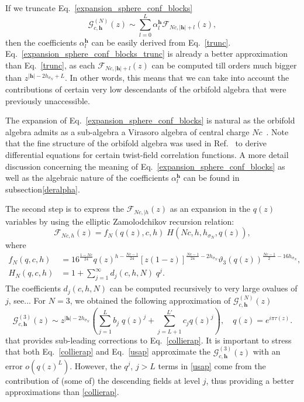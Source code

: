 \documentclass[a4paper,11pt]{article}
\begin{document}
\noindent If we truncate Eq.~\eqref{expansion_sphere_conf_blocks}  
\begin{equation}\label{expansion_sphere_conf_blocks_trunc}
 \mathcal{G}_{c, \boldsymbol{h}}^{(N)}(z)\sim\sum_{l=0}^{L}\alpha_{l}^{\boldsymbol{h}}
 \mathcal{F}_{Nc, |\boldsymbol{h}|+l}(z),
\end{equation}
then the coefficients $\alpha_{l}^{\boldsymbol{h}}$ can be easily derived from Eq.~\eqref{trunc}.
Eq.~\eqref{expansion_sphere_conf_blocks_trunc} is already a better approximation than 
Eq.~\eqref{trunc}, as each  $\mathcal{F}_{Nc, |\boldsymbol{h}|+l}(z)$ can be computed till orders much bigger than $z^{|\boldsymbol{h}|-2h_{\sigma_N}+L}$. In other words, this means that we can take into account the contributions of certain very low descendants of the orbifold algebra that were previously unaccessible.

\noindent The expansion of Eq.~\eqref{expansion_sphere_conf_blocks} is natural as the orbifold algebra admits as a sub-algebra a Virasoro algebra of central charge $N c$~\cite{Borisov}. Note that the fine structure of the orbifold algebra was used in Ref.~\cite{Dupic} to derive differential equations for certain twist-field correlation functions. A more detail discussion concerning the meaning of Eq.~\eqref{expansion_sphere_conf_blocks}  as well as the algebraic nature of the coefficients $\alpha_{l}^{\boldsymbol{h}}$ can be found in subsection\ref{deralpha}.

\noindent The second step is to express the $\mathcal{F}_{N c, |h }(z)$ as an expansion in the $q(z)$ variables by using the elliptic Zamolodchikov recursion relation:
\begin{equation}
 \mathcal{F}_{Nc, h}(z)=
 f_N(q(z), c, h) \;H(Nc, h, h_{\sigma_N}, q(z)),
\end{equation}
where
\begin{align}
f_N(q, c, h) &= 16^{\frac{1-Nc}{24}}q(z)^{h-\frac{Nc-1}{24}}
 [z(1-z)]^{\frac{Nc-1}{24}-2h_{\sigma_N}}
 \vartheta_3(q(z))^{\frac{Nc-1}{2}-16h_{\sigma_N}}, \\
 H_N(q, c, h)&=1+\sum_{j=1}^{\infty}d_j(c, h,N)\;q^j.
\end{align}
The coefficients $d_j(c, h,N) $ can be computed recursively to very large ovalues of $j$, see...
For $N=3$,  we obtained the following  approximation of  $\mathcal{G}_{c, \boldsymbol{h}}^{(N)}(z)$ 
\begin{equation}
\label{usap}
\mathcal{G}_{c,\boldsymbol{h}}^{(3)}(z) \sim z^{|\boldsymbol{h}|-2h_{\sigma_N}} \left(\sum_{j=1}^{L} b_j \; q(z)^j+\sum_{j=L+1}^{L'} c_j q(z)^{j}\right), \quad q(z)= e^{i \pi \tau(z)} .
\end{equation}
that provides sub-leading corrections to Eq.~\eqref{collierap}. It is important to stress that both Eq.~\eqref{collierap} and Eq.~\eqref{usap} approximate the $ \mathcal{G}_{c,\boldsymbol{h}}^{(3)}(z)$  with an error  $o(q(z)^{L})$. However, the $q^{j}$, $j>L$ terms in  \eqref{usap} come from the contribution of (some of) the descending fields at level $j$, thus providing a better approximations than \eqref{collierap}.  
\end{document}

